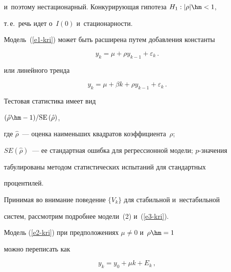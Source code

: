 и~поэтому нестационарный. Конкурирующая гипотеза $H_1: \vert\rho\vert \hm<1$, 


т.\,е.\ речь идет о~$I(0)$ и~стационарности.





     Модель~(\ref{e1-kri}) может быть расширена путем до\-бав\-ле\-ния константы 


     \begin{equation}


     y_k= \mu +\rho y_{k-1} +\varepsilon_k\,.


     \label{e2-kri}


     \end{equation}


или линейного тренда


\begin{equation}


y_k= \mu+\beta k+ \rho y_{k-1} +\varepsilon_k\,.


\label{e3-kri}


\end{equation}


     


     Тестовая статистика имеет вид


     $(\hat{\rho}\hm-1)/\mathrm{SE}\,(\hat{\rho})$,


где $\hat{\rho}$~--- оценка наименьших квадратов коэффициента~$\rho$; 


$SE(\hat{\rho})$~--- ее стандартная ошибка для регрессионной модели; $p$-зна\-че\-ния


 табулированы методом статистических испытаний для стандартных 


процентилей.


     


     Принимая во внимание поведение $\{V_k\}$ для стабильной и~нестабильной 


сис\-тем, рас\-смот\-рим по\-дроб\-нее модели~(2) и~(\ref{e3-kri}).


     


     Модель (\ref{e2-kri}) при предположениях $\mu\not= 0$ и~$\rho\hm=1$ 


можно переписать как


     \begin{equation}


     y_k= y_0 +\mu k+E_k\,, 


     \label{e4-kri}


     \end{equation}


